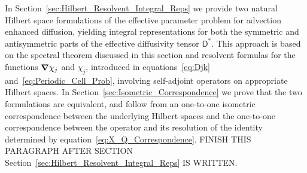 \documentclass[leqno,onefignum,onetabnum]{siamltex1213}
\newcommand{\secref}[1]{Section~\ref{#1}}
\newcommand{\Dm}{\mathsf{D}}
\newcommand\bnabla{\mbox{\boldmath${\nabla}$}}
\begin{document}
In \secref{sec:Hilbert_Resolvent_Integral_Reps} we provide two natural Hilbert space
formulations of the effective parameter problem for advection enhanced
diffusion, yielding integral representations for both the symmetric and
antisymmetric parts of the effective diffusivity tensor $\Dm^*$. This
approach is based on the spectral theorem discussed in this section
and resolvent formulas for the functions $\bnabla\chi_j$ and $\chi_j$,
introduced in equations~\eqref{eq:Djk}
and~\eqref{eq:Periodic_Cell_Prob}, involving self-adjoint operators on
appropriate Hilbert spaces. In \secref{sec:Isometric_Correspondence}
we prove that the two formulations are equivalent, and follow from an
one-to-one isometric correspondence between the underlying Hilbert
spaces and the one-to-one correspondence between the operator and its
resolution of the identity determined by
equation~\eqref{eq:X_Q_Correspondence}.
FINISH THIS PARAGRAPH AFTER SECTION
\secref{sec:Hilbert_Resolvent_Integral_Reps} IS WRITTEN. 
\end{document}
